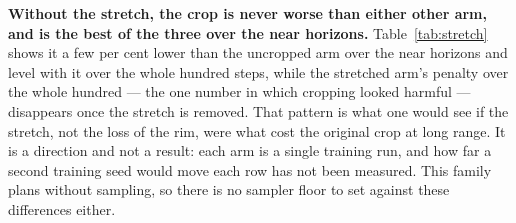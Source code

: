 \textbf{Without the stretch, the crop is never worse than either other arm, and
is the best of the three over the near horizons.} Table~\ref{tab:stretch} shows it a few per cent lower than the
uncropped arm over the near horizons and level with it over the whole
hundred steps, while the stretched arm's penalty over the whole hundred ---
the one number in which cropping looked harmful --- disappears once the stretch
is removed. That pattern is what one would see if the stretch, not the loss of
the rim, were what cost the original crop at long range. It is a direction and
not a result: each arm is a single training run, and how far a second training
seed would move each row has not been measured. This family plans without
sampling, so there is no sampler floor to set against these differences either.
